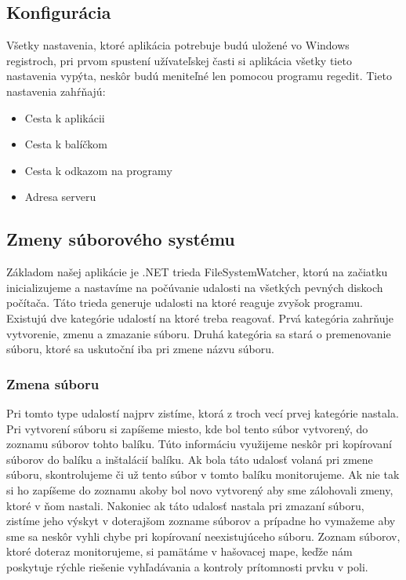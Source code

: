 \subsection{Konfigurácia}
Všetky nastavenia, ktoré aplikácia potrebuje budú uložené vo Windows registroch, pri prvom spustení užívateľskej časti si aplikácia všetky tieto nastavenia vypýta, neskôr budú meniteľné len pomocou programu regedit. Tieto nastavenia zahŕňajú:
\begin{itemize}
\item Cesta k aplikácii
\item Cesta k balíčkom
\item Cesta k odkazom na programy
\item Adresa serveru
\end{itemize}

\subsection{Zmeny súborového systému}
\label{subsec:fsw}
Základom našej aplikácie je .NET trieda FileSystemWatcher, ktorú na začiatku inicializujeme a nastavíme na počúvanie udalosti na všetkých pevných diskoch počítača. Táto trieda generuje udalosti na ktoré reaguje zvyšok programu. Existujú dve kategórie udalostí na ktoré treba reagovať. Prvá kategória zahrňuje vytvorenie, zmenu a zmazanie súboru. Druhá kategória sa stará o premenovanie súboru, ktoré sa uskutoční iba pri zmene názvu súboru. 

\subsubsection{Zmena súboru}
Pri tomto type udalostí najprv zistíme, ktorá z troch vecí prvej kategórie nastala. Pri vytvorení súboru si zapíšeme miesto, kde bol tento súbor vytvorený, do zoznamu súborov tohto balíku. Túto informáciu využijeme neskôr pri kopírovaní súborov do balíku a inštalácií balíku. Ak bola táto udalosť volaná pri zmene súboru, skontrolujeme či už tento súbor v tomto balíku monitorujeme. Ak nie tak si ho zapíšeme do zoznamu akoby bol novo vytvorený aby sme zálohovali zmeny, ktoré v ňom nastali. Nakoniec ak táto udalosť nastala pri zmazaní súboru, zistíme jeho výskyt v doterajšom zozname súborov a prípadne ho vymažeme aby sme sa neskôr vyhli chybe pri kopírovaní neexistujúceho súboru. Zoznam súborov, ktoré doteraz monitorujeme, si pamätáme v hašovacej mape, keďže nám poskytuje rýchle riešenie vyhľadávania a kontroly prítomnosti prvku v poli.

